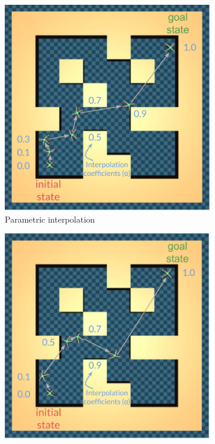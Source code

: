 \documentclass{article} %
\begin{document}
\begin{figure}[t]
    \centering
    \begin{subfigure}[c]{0.49\textwidth}
    \centering
        \includegraphics[width=\linewidth]{figures/latent_interpolation/repr_vis_parametric.pdf}
        \caption{Parametric interpolation}
    \end{subfigure}
    \hfill
    \begin{subfigure}[c]{0.49\textwidth}
        \includegraphics[width=\linewidth]{figures/latent_interpolation/repr_vis_non_parametric.pdf}

\end{subfigure}
\end{figure}
\end{document}
